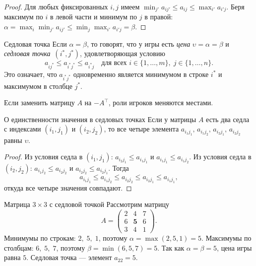 \begin{proof}
Для любых фиксированных $i, j$ имеем
$\min_{j'} a_{ij'} \leq a_{ij} \leq \max_{i'} a_{i'j}$.
Беря максимум по $i$ в левой части и минимум по $j$ в правой:
$\alpha = \max_i \min_{j'} a_{ij'} \leq \min_j \max_{i'} a_{i'j} = \beta$. 
\end{proof}

\begin{Definition}{Седловая точка}{}
	Если $\alpha = \beta$, то говорят, что у игры есть \emph{цена} $\upsilon = \alpha = \beta$ и \emph{седловая точка}~$(i^*, j^*)$, удовлетворяющая условию
	\[
	a_{ij^*} \leq a_{i^*j^*} \leq a_{i^*j} \quad \text{для всех } i \in \{1,\ldots,m\},\; j \in \{1,\ldots,n\}.
	\]
	Это означает, что $a_{i^*j^*}$ одновременно является минимумом в строке $i^*$ и максимумом в столбце $j^*$.
\end{Definition}

\begin{Remark}{}{}
	Если заменить матрицу $A$ на $-A^{\top}$, роли игроков меняются местами.
\end{Remark}

\begin{Statement}{О единственности значения в седловых точках}{}
	Если у матрицы $A$ есть два седла с индексами $(i_1, j_1)$ и $(i_2, j_2)$, то все четыре элемента
	$a_{i_1 j_1},\, a_{i_1 j_2},\, a_{i_2 j_1},\, a_{i_2 j_2}$ равны $\upsilon$.
\end{Statement}

\begin{proof}
 Из условия седла в $(i_1, j_1)$: $a_{i_2 j_1} \leq a_{i_1 j_1}$ и $a_{i_1 j_1} \leq a_{i_1 j_2}$.
Из условия седла в $(i_2, j_2)$: $a_{i_1 j_2} \leq a_{i_2 j_2}$ и $a_{i_2 j_2} \leq a_{i_2 j_1}$.
Тогда
\[
a_{i_1 j_1} \leq a_{i_1 j_2} \leq a_{i_2 j_2} \leq a_{i_2 j_1} \leq a_{i_1 j_1},
\]
откуда все четыре значения совпадают.
\end{proof}

\begin{Example}{Матрица $3\times 3$ с седловой точкой}{}
	Рассмотрим матрицу
	\[
	A = \begin{pmatrix} 2 & 4 & 7 \\ 6 & \mathbf{5} & 6 \\ 3 & 4 & 1 \end{pmatrix}.
	\]
	Минимумы по строкам: $2,\; 5,\; 1$, поэтому $\alpha = \max(2, 5, 1) = 5$.
	Максимумы по столбцам: $6,\; 5,\; 7$, поэтому $\beta = \min(6, 5, 7) = 5$.
	Так как $\alpha = \beta = 5$, цена игры равна $5$. Седловая точка --- элемент $a_{22} = 5$.
\end{Example}

